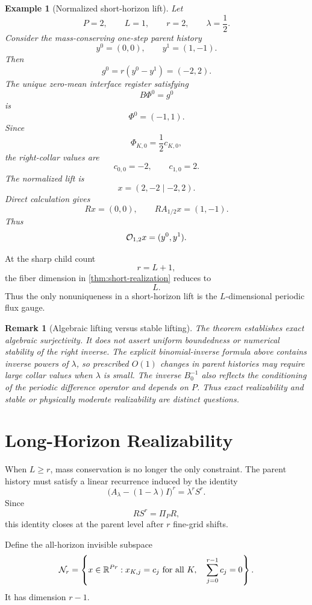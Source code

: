 \documentclass[11pt]{article}
\newtheorem{remark}{Remark}
\newtheorem{example}{Example}
\newcommand{\R}{\mathbb R}
\begin{document}
\begin{example}[Normalized short-horizon lift]
\label{ex:canonical-lift}
Let
\[
  P=2,
  \qquad
  L=1,
  \qquad
  r=2,
  \qquad
  \lambda=\frac12.
\]
Consider the mass-conserving one-step parent history
\[
  y^0=(0,0),
  \qquad
  y^1=(1,-1).
\]
Then
\[
  g^0=r(y^0-y^1)=(-2,2).
\]
The unique zero-mean interface register satisfying
\[
  B\Phi^0=g^0
\]
is
\[
  \Phi^0=(-1,1).
\]
Since
\[
  \Phi_{K,0}=\frac12c_{K,0},
\]
the right-collar values are
\[
  c_{0,0}=-2,
  \qquad
  c_{1,0}=2.
\]
The normalized lift is
\[
  x=(2,-2\mid -2,2).
\]
Direct calculation gives
\[
  Rx=(0,0),
  \qquad
  RA_{1/2}x=(1,-1).
\]
Thus
\[
  {\cal O}_{1,2}x=(y^0,y^1).
\]
\end{example}

At the sharp child count
\[
  r=L+1,
\]
the fiber dimension in \cref{thm:short-realization} reduces to
\[
  L.
\]
Thus the only nonuniqueness in a short-horizon lift is the \(L\)-dimensional
periodic flux gauge.

\begin{remark}[Algebraic lifting versus stable lifting]
The theorem establishes exact algebraic surjectivity.  It does not assert
uniform boundedness or numerical stability of the right inverse.  The explicit
binomial-inverse formula above contains inverse powers of \(\lambda\), so
prescribed \(O(1)\) changes in parent histories may require large collar
values when \(\lambda\) is small. The inverse
\(B_0^{-1}\) also reflects the conditioning of the periodic difference
operator and depends on \(P\).  Thus exact realizability and stable or
physically moderate realizability are distinct questions.
\end{remark}

\section{Long-Horizon Realizability}
\label{sec:long-horizon}

When \(L\ge r\), mass conservation is no longer the only constraint.  The
parent history must satisfy a linear recurrence induced by the identity
\[
  \bigl(A_\lambda-(1-\lambda)I\bigr)^r=\lambda^rS^r.
\]
Since
\[
  RS^r=\Pi_PR,
\]
this identity closes at the parent level after \(r\) fine-grid shifts.

Define the all-horizon invisible subspace
\[
  {\cal N}_r
  =
  \left\{
  x\in\R^{Pr}:
  x_{K,j}=c_j\ \text{for all }K,\quad
  \sum_{j=0}^{r-1}c_j=0
  \right\}.
\]
It has dimension \(r-1\).
\end{document}
